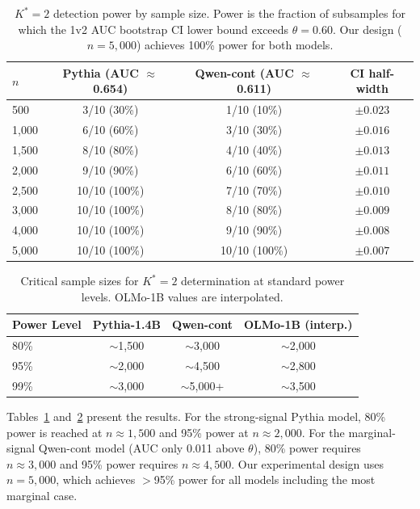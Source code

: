 \documentclass[11pt,a4paper]{article}
\begin{document}
\begin{table}[t]
\centering
\caption{$K^*{=}2$ detection power by sample size. Power is the fraction of subsamples for which the 1v2 AUC bootstrap CI lower bound exceeds $\theta{=}0.60$. Our design ($n{=}5{,}000$) achieves 100\% power for both models.}
\label{tab:power}
\small
\begin{tabular}{lccc}
\toprule
\textbf{$n$} & \textbf{Pythia (AUC $\approx$ 0.654)} & \textbf{Qwen-cont (AUC $\approx$ 0.611)} & \textbf{CI half-width} \\
\midrule
500 & 3/10 (30\%) & 1/10 (10\%) & $\pm 0.023$ \\
1,000 & 6/10 (60\%) & 3/10 (30\%) & $\pm 0.016$ \\
1,500 & 8/10 (80\%) & 4/10 (40\%) & $\pm 0.013$ \\
2,000 & 9/10 (90\%) & 6/10 (60\%) & $\pm 0.011$ \\
2,500 & 10/10 (100\%) & 7/10 (70\%) & $\pm 0.010$ \\
3,000 & 10/10 (100\%) & 8/10 (80\%) & $\pm 0.009$ \\
4,000 & 10/10 (100\%) & 9/10 (90\%) & $\pm 0.008$ \\
5,000 & 10/10 (100\%) & 10/10 (100\%) & $\pm 0.007$ \\
\bottomrule
\end{tabular}
\end{table}

\begin{table}[t]
\centering
\caption{Critical sample sizes for $K^*{=}2$ determination at standard power levels. OLMo-1B values are interpolated.}
\label{tab:critical_n}
\small
\begin{tabular}{lccc}
\toprule
\textbf{Power Level} & \textbf{Pythia-1.4B} & \textbf{Qwen-cont} & \textbf{OLMo-1B (interp.)} \\
\midrule
80\% & $\sim$1,500 & $\sim$3,000 & $\sim$2,000 \\
95\% & $\sim$2,000 & $\sim$4,500 & $\sim$2,800 \\
99\% & $\sim$3,000 & $\sim$5,000+ & $\sim$3,500 \\
\bottomrule
\end{tabular}
\end{table}

Tables~\ref{tab:power} and~\ref{tab:critical_n} present the results. For the strong-signal Pythia model, 80\% power is reached at $n \approx 1{,}500$ and 95\% power at $n \approx 2{,}000$. For the marginal-signal Qwen-cont model (AUC only 0.011 above $\theta$), 80\% power requires $n \approx 3{,}000$ and 95\% power requires $n \approx 4{,}500$. Our experimental design uses $n{=}5{,}000$, which achieves $>$95\% power for all models including the most marginal case.
\end{document}

